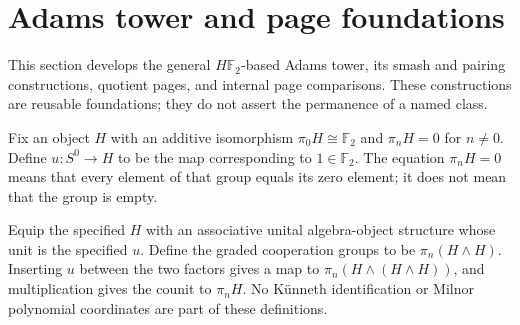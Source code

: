 \section{Adams tower and page foundations}
\label{chap:adams-tower-foundations}

This section develops the general $H\mathbb F_2$-based Adams tower, its
smash and pairing constructions, quotient pages, and internal page
comparisons. These constructions are reusable foundations; they do not
assert the permanence of a named class.

\begin{definition}
  \label{def:h6-em-object}
  \leanok
  Fix an object $H$ with an additive isomorphism
  $\pi_0H\cong\mathbb F_2$ and $\pi_nH=0$ for $n\ne0$.
  Define $u:S^0\to H$ to be the map corresponding to $1\in\mathbb F_2$.
  The equation $\pi_nH=0$ means that every element of that group equals its
  zero element; it does not mean that the group is empty.
\end{definition}

\begin{definition}
  \label{def:h6-ring-cooperations}
  \leanok
  Equip the specified $H$ with an associative unital algebra-object
  structure whose unit is the specified $u$. Define the graded cooperation
  groups to be $\pi_n(H\wedge H)$. Inserting $u$ between the two factors
  gives a map to $\pi_n(H\wedge(H\wedge H))$, and multiplication gives
  the counit to $\pi_nH$. No K\"unneth identification or Milnor polynomial
  coordinates are part of these definitions.
\end{definition}

